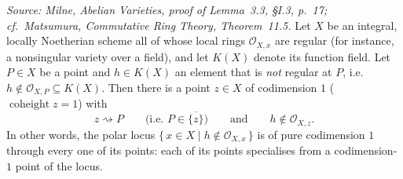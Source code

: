 \begin{lemma}
  \label{lem:pole_divisor_purity}
  \leanok
  \textit{Source: Milne, \emph{Abelian Varieties}, proof of Lemma~3.3, \S I.3, p.~17;
  cf.\ Matsumura, \emph{Commutative Ring Theory}, Theorem~11.5.}
  Let \(X\) be an integral, locally Noetherian scheme all of whose local rings
  \(\mathcal O_{X, x}\) are regular (for instance, a nonsingular variety over a field),
  and let \(K(X)\) denote its function field. Let \(P \in X\) be a point and
  \(h \in K(X)\) an element that is \emph{not} regular at \(P\), i.e.\
  \(h \notin \mathcal O_{X, P} \subseteq K(X)\). Then there is a point \(z \in X\) of
  codimension \(1\) (\(\operatorname{coheight} z = 1\)) with
  \[
    z \rightsquigarrow P
    \qquad\text{(i.e.\ } P \in \overline{\{z\}}\text{)}
    \qquad\text{and}\qquad
    h \notin \mathcal O_{X, z}.
  \]
  In other words, the polar locus
  \(\{\, x \in X \mid h \notin \mathcal O_{X, x} \,\}\) is of pure codimension \(1\)
  through every one of its points: each of its points specialises from a
  codimension-\(1\) point of the locus.
\end{lemma}

